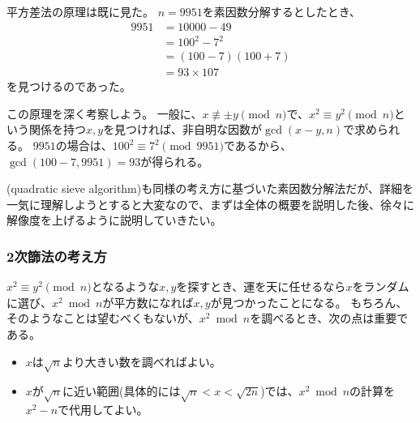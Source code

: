 平方差法の原理は既に見た。
$n=9951$を素因数分解するとしたとき、
\begin{align*}
9951 &= 10000 - 49\\
&= 100^2 - 7^2\\
&= (100 - 7)(100 + 7)\\
&= 93 \times 107
\end{align*}
を見つけるのであった。

この原理を深く考察しよう。
一般に、$x\not\equiv\pm y\pmod{n}$で、$x^2\equiv y^2\pmod{n}$という関係を持つ$x,y$を見つければ、非自明な因数が$\gcd(x-y, n)$で求められる。
$9951$の場合は、$100^2\equiv7^2\pmod{9951}$であるから、$\gcd(100-7, 9951)=93$が得られる。

(quadratic sieve algorithm)も同様の考え方に基づいた素因数分解法だが、詳細を一気に理解しようとすると大変なので、まずは全体の概要を説明した後、徐々に解像度を上げるように説明していきたい。

\subsubsection{2次篩法の考え方}
$x^2\equiv y^2\pmod{n}$となるような$x,y$を探すとき、運を天に任せるなら$x$をランダムに選び、$x^2\bmod{n}$が平方数になれば$x,y$が見つかったことになる。
もちろん、そのようなことは望むべくもないが、$x^2\bmod{n}$を調べるとき、次の点は重要である。

\begin{itemize}
 \item $x$は$\sqrt{n}$より大きい数を調べればよい。
 \item $x$が$\sqrt{n}$に近い範囲(具体的には$\sqrt{n}<x<\sqrt{2n}$)では、$x^2\bmod{n}$の計算を$x^2-n$で代用してよい。
\end{itemize}

